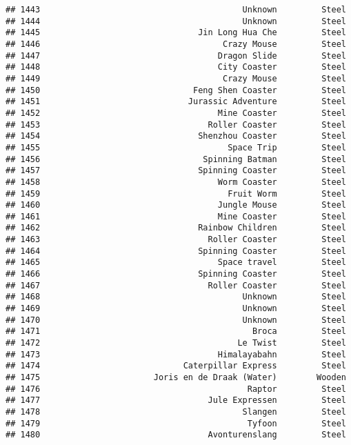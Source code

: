 \documentclass[
]{article}
\begin{document}
\begin{verbatim}
## 1443                                         Unknown         Steel
## 1444                                         Unknown         Steel
## 1445                                Jin Long Hua Che         Steel
## 1446                                     Crazy Mouse         Steel
## 1447                                    Dragon Slide         Steel
## 1448                                    City Coaster         Steel
## 1449                                     Crazy Mouse         Steel
## 1450                               Feng Shen Coaster         Steel
## 1451                              Jurassic Adventure         Steel
## 1452                                    Mine Coaster         Steel
## 1453                                  Roller Coaster         Steel
## 1454                                Shenzhou Coaster         Steel
## 1455                                      Space Trip         Steel
## 1456                                 Spinning Batman         Steel
## 1457                                Spinning Coaster         Steel
## 1458                                    Worm Coaster         Steel
## 1459                                      Fruit Worm         Steel
## 1460                                    Jungle Mouse         Steel
## 1461                                    Mine Coaster         Steel
## 1462                                Rainbow Children         Steel
## 1463                                  Roller Coaster         Steel
## 1464                                Spinning Coaster         Steel
## 1465                                    Space travel         Steel
## 1466                                Spinning Coaster         Steel
## 1467                                  Roller Coaster         Steel
## 1468                                         Unknown         Steel
## 1469                                         Unknown         Steel
## 1470                                         Unknown         Steel
## 1471                                           Broca         Steel
## 1472                                        Le Twist         Steel
## 1473                                    Himalayabahn         Steel
## 1474                             Caterpillar Express         Steel
## 1475                       Joris en de Draak (Water)        Wooden
## 1476                                          Raptor         Steel
## 1477                                  Jule Expressen         Steel
## 1478                                         Slangen         Steel
## 1479                                          Tyfoon         Steel
## 1480                                  Avonturenslang         Steel

\end{verbatim}
\end{document}
